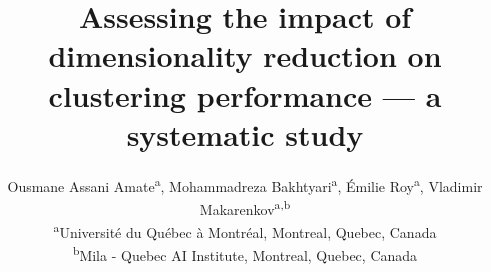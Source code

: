 \documentclass[preprint,12pt]{elsarticle}
\begin{document}
\begin{@twocolumnfalse}  %
\begin{frontmatter}



\title{Assessing the impact of dimensionality reduction on clustering performance — a systematic study}



\author{
Ousmane Assani Amate\textsuperscript{a},
Mohammadreza Bakhtyari\textsuperscript{a},
Émilie Roy\textsuperscript{a},
Vladimir Makarenkov\textsuperscript{a,b} \\[1em]
\textsuperscript{a}Université du Québec à Montréal, Montreal, Quebec, Canada\\
\textsuperscript{b}Mila - Quebec AI Institute, Montreal, Quebec, Canada
}




\end{frontmatter}
\end{@twocolumnfalse}
\end{document}
